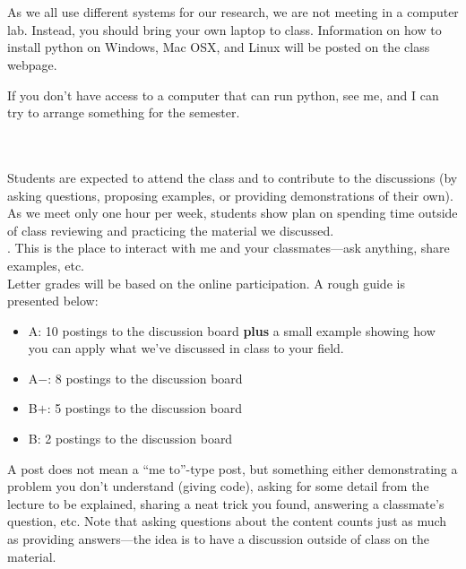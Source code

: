 \documentclass[11pt]{article}
\begin{document}
\ \\[-2mm]
 \\
%
As we all use different systems for our research, we are not meeting
in a computer lab.  Instead, you should bring your own laptop to
class.  Information on how to install python on Windows, Mac OSX, and
Linux will be posted on the class webpage. 

\noindent
If you don't have access to a computer that can run python, see me,
and I can try to arrange something for the semester.

\ \\[-2mm]
 \\
%
Students are expected to attend the class and to contribute
to the discussions (by asking questions, proposing examples, or
providing demonstrations of their own).  As we meet only one hour per
week, students show plan on spending time outside of class reviewing
and practicing the material we discussed. \\

.  This is the place to interact with
me and your classmates---ask anything, share examples, etc. \\

\noindent Letter grades will be based on the online participation.  A
rough guide is presented below:
\begin{itemize}
\item {\sf A\phantom{+}}: 10 postings to the discussion board
  {\bf plus} a small example showing how you can apply what
  we've discussed in class to your field.

\item {\sf A$-$}: 8 postings to the discussion board

\item {\sf B$+$}: 5 postings to the discussion board

\item {\sf B\phantom{+}}:  2 postings to the discussion board
\end{itemize}
A post does not mean a ``me to''-type post, but something either
demonstrating a problem you don't understand (giving code), asking for
some detail from the lecture to be explained, sharing a neat trick you
found, answering a classmate's question, etc.  Note that asking
questions about the content counts just as much as providing
answers---the idea is to have a discussion outside of class on the
material.
\end{document}
